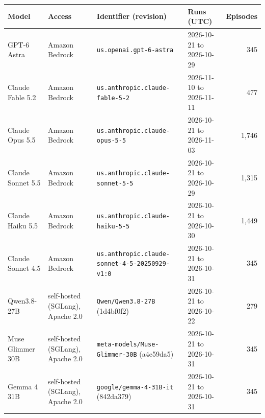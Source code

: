 \begin{tabular}{llllr}
\toprule
Model & Access & Identifier (revision) & Runs (UTC) & Episodes \\
\midrule
GPT-6 Astra & Amazon Bedrock & \texttt{us.openai.gpt-6-astra} & 2026-10-21 to 2026-10-29 & 345 \\
Claude Fable 5.2 & Amazon Bedrock & \texttt{us.anthropic.claude-fable-5-2} & 2026-11-10 to 2026-11-11 & 477 \\
Claude Opus 5.5 & Amazon Bedrock & \texttt{us.anthropic.claude-opus-5-5} & 2026-10-21 to 2026-11-03 & 1{,}746 \\
Claude Sonnet 5.5 & Amazon Bedrock & \texttt{us.anthropic.claude-sonnet-5-5} & 2026-10-21 to 2026-10-29 & 1{,}315 \\
Claude Haiku 5.5 & Amazon Bedrock & \texttt{us.anthropic.claude-haiku-5-5} & 2026-10-21 to 2026-10-30 & 1{,}449 \\
Claude Sonnet 4.5 & Amazon Bedrock & \texttt{us.anthropic.claude-sonnet-4-5-20250929-v1:0} & 2026-10-21 to 2026-10-31 & 345 \\
Qwen3.8-27B & self-hosted (SGLang){,} Apache 2.0 & \texttt{Qwen/Qwen3.8-27B} (1d4bf0f2) & 2026-10-21 to 2026-10-22 & 279 \\
Muse Glimmer 30B & self-hosted (SGLang){,} Apache 2.0 & \texttt{meta-models/Muse-Glimmer-30B} (a4e59da5) & 2026-10-21 to 2026-10-31 & 345 \\
Gemma 4 31B & self-hosted (SGLang){,} Apache 2.0 & \texttt{google/gemma-4-31B-it} (842da379) & 2026-10-21 to 2026-10-31 & 345 \\
\bottomrule
\end{tabular}
